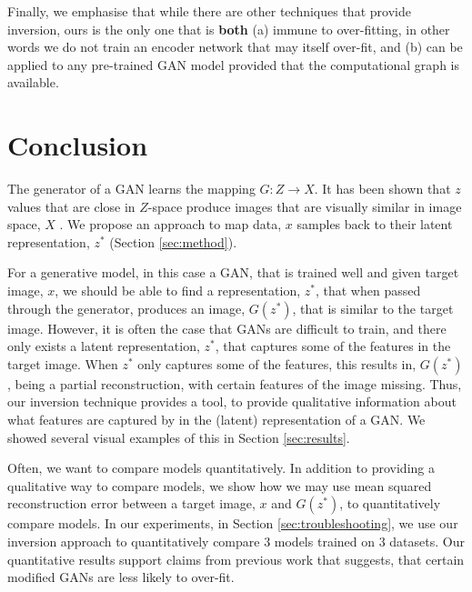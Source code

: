 \documentclass[journal]{IEEEtran}
\begin{document}
Finally, we emphasise that while there are other techniques that provide inversion, ours is the only one that is \textbf{both} (a) immune to over-fitting, in other words we do not train an encoder network that may itself over-fit, and (b) can be applied to any pre-trained GAN model provided that the computational graph is available.













\section{Conclusion}

The generator of a GAN learns the mapping $G: Z \rightarrow X$. It has been shown that $z$ values that are close in $Z$-space produce images that are visually similar in image space, $X$ \cite{radford2015unsupervised}. We propose an approach to map data, $x$ samples back to their latent representation, $z^*$ (Section \ref{sec:method}).

For a generative model, in this case a GAN, that is trained well and given target image, $x$, we should be able to find a representation, $z^*$, that when passed through the generator, produces an image, $G(z^*)$, that is similar to the target image. However, it is often the case that GANs are difficult to train, and there only exists a latent representation, $z^*$, that captures some of the features in the target image. When $z^*$ only captures some of the features, this results in, $G(z^*)$, being a partial reconstruction, with certain features of the image missing. Thus, our inversion technique provides a tool, to provide qualitative information about what features are captured by in the (latent) representation of a GAN. We showed several visual examples of this in Section \ref{sec:results}.

Often, we want to compare models quantitatively. In addition to providing a qualitative way to compare models, we show how we may use mean squared reconstruction error between a target image, $x$ and $G(z^*)$, to quantitatively compare models. In our experiments, in Section \ref{sec:troubleshooting}, we use our inversion approach to quantitatively compare $3$ models trained on $3$ datasets. Our quantitative results support claims from previous work that suggests, that certain modified GANs are less likely to over-fit.
\end{document}
